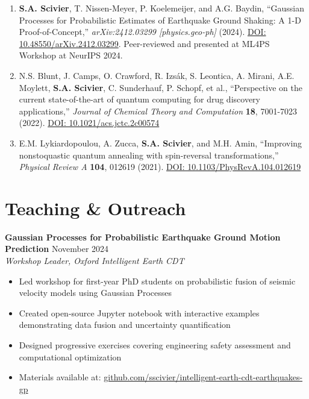 \documentclass[11pt,a4paper]{article}
\newcommand{\cventry}[4]{%
    \noindent\textbf{#1} \hfill #2\\
    \textit{#3} \hfill #4\\[0.1em]
}
\newcommand{\publication}[1]{%
    \item #1
}
\begin{document}
\begin{enumerate}
\publication{\textbf{S.A. Scivier}, T. Nissen-Meyer, P. Koelemeijer, and A.G. Baydin, ``Gaussian Processes for Probabilistic Estimates of Earthquake Ground Shaking: A 1-D Proof-of-Concept,'' \textit{arXiv:2412.03299 [physics.geo-ph]} (2024). \href{https://doi.org/10.48550/arXiv.2412.03299}{DOI: 10.48550/arXiv.2412.03299}. Peer-reviewed and presented at ML4PS Workshop at NeurIPS 2024.}

\publication{N.S. Blunt, J. Camps, O. Crawford, R. Izsák, S. Leontica, A. Mirani, A.E. Moylett, \textbf{S.A. Scivier}, C. Sunderhauf, P. Schopf, et al., ``Perspective on the current state-of-the-art of quantum computing for drug discovery applications,'' \textit{Journal of Chemical Theory and Computation} \textbf{18}, 7001-7023 (2022). \href{https://doi.org/10.1021/acs.jctc.2c00574}{DOI: 10.1021/acs.jctc.2c00574}}

\publication{E.M. Lykiardopoulou, A. Zucca, \textbf{S.A. Scivier}, and M.H. Amin, ``Improving nonstoquastic quantum annealing with spin-reversal transformations,'' \textit{Physical Review A} \textbf{104}, 012619 (2021). \href{https://doi.org/10.1103/PhysRevA.104.012619}{DOI: 10.1103/PhysRevA.104.012619}}
\end{enumerate}

\section*{Teaching \& Outreach}

\cventry{Gaussian Processes for Probabilistic Earthquake Ground Motion Prediction}{November 2024}{Workshop Leader, Oxford Intelligent Earth CDT}{}
\begin{itemize}
    \item Led workshop for first-year PhD students on probabilistic fusion of seismic velocity models using Gaussian Processes
    \item Created open-source Jupyter notebook with interactive examples demonstrating data fusion and uncertainty quantification
    \item Designed progressive exercises covering engineering safety assessment and computational optimization
    \item Materials available at: \href{https://github.com/sscivier/intelligent-earth-cdt-earthquakes-gp}{github.com/sscivier/intelligent-earth-cdt-earthquakes-gp}
\end{itemize}

\end{document}
